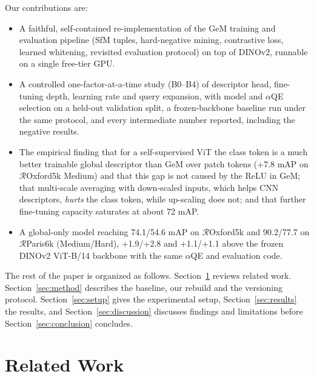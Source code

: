 \documentclass[runningheads]{llncs}
\newcommand{\roxf}{$\mathcal{R}$Oxford5k}
\newcommand{\rpar}{$\mathcal{R}$Paris6k}
\newcommand{\aqe}{$\alpha$QE}
\begin{document}
Our contributions are:
\begin{itemize}
\item A faithful, self-contained re-implementation of the GeM training and
evaluation pipeline (SfM tuples, hard-negative mining, contrastive loss,
learned whitening, revisited evaluation protocol) on top of DINOv2, runnable on
a single free-tier GPU.
\item A controlled one-factor-at-a-time study (B0--B4) of descriptor head,
fine-tuning depth, learning rate and query expansion, with model and \aqe{}
selection on a held-out validation split, a frozen-backbone baseline run under
the same protocol, and every intermediate number reported, including the
negative results.
\item The empirical finding that for a self-supervised ViT the class token is a
much better trainable global descriptor than GeM over patch tokens
(+7.8 mAP on \roxf{} Medium) and that this gap is not caused by the ReLU in
GeM; that multi-scale averaging with down-scaled inputs, which helps CNN
descriptors, \emph{hurts} the class token, while up-scaling does not; and that
further fine-tuning capacity saturates at about 72 mAP.
\item A global-only model reaching 74.1/54.6 mAP on \roxf{} and 90.2/77.7 on
\rpar{} (Medium/Hard), +1.9/+2.8 and +1.1/+1.1 above the frozen DINOv2
ViT-B/14 backbone with the same \aqe{} and evaluation code.
\end{itemize}

The rest of the paper is organized as follows. Section~\ref{sec:related}
reviews related work. Section~\ref{sec:method} describes the baseline, our
rebuild and the versioning protocol. Section~\ref{sec:setup} gives the
experimental setup, Section~\ref{sec:results} the results, and
Section~\ref{sec:discussion} discusses findings and limitations before
Section~\ref{sec:conclusion} concludes.

\section{Related Work}
\label{sec:related}
\end{document}

